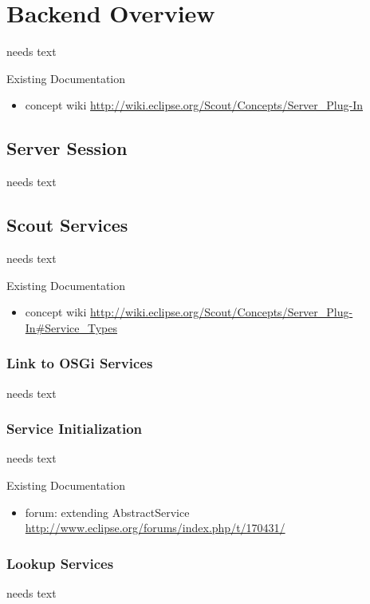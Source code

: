 \documentclass[a4paper,10pt,twoside]{book}
\begin{document}
  \sloppy
\fi


\chapter{Backend Overview}
needs text

\noindent Existing Documentation
\begin{itemize}
  \item concept wiki \url{http://wiki.eclipse.org/Scout/Concepts/Server_Plug-In}
\end{itemize}

\section{Server Session}
needs text

\section{Scout Services}
needs text

\noindent Existing Documentation
\begin{itemize}
  \item concept wiki \url{http://wiki.eclipse.org/Scout/Concepts/Server_Plug-In#Service_Types}
\end{itemize}

\subsection{Link to OSGi Services}
needs text

\subsection{Service Initialization}
needs text

\noindent Existing Documentation
\begin{itemize}
  \item forum: extending AbstractService \url{http://www.eclipse.org/forums/index.php/t/170431/}
\end{itemize}

\subsection{Lookup Services}
needs text
\end{document}
